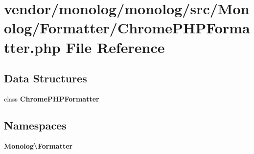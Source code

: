 \section{vendor/monolog/monolog/src/\+Monolog/\+Formatter/\+Chrome\+P\+H\+P\+Formatter.php File Reference}
\label{_chrome_p_h_p_formatter_8php}
\subsection*{Data Structures}
\begin{DoxyCompactItemize}
\item 
class {\bf Chrome\+P\+H\+P\+Formatter}
\end{DoxyCompactItemize}
\subsection*{Namespaces}
\begin{DoxyCompactItemize}
\item 
 {\bf Monolog\textbackslash{}\+Formatter}
\end{DoxyCompactItemize}
